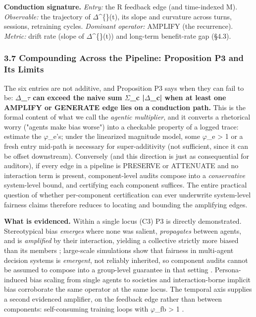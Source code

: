 \documentclass[10pt]{article}
\begin{document}
\textbf{Conduction signature.} \emph{Entry:} the R feedback edge (and time-indexed M). \emph{Observable:} the trajectory of $\Delta$\textasciicircum\{\}(t), its slope and curvature across turns, sessions, retraining cycles. \emph{Dominant operator:} AMPLIFY (the recurrence). \emph{Metric:} drift rate (slope of $\Delta$\textasciicircum\{\}(t)) and long-term benefit-rate gap \cite{xu2024adapting} (\S{}4.3).

\subsubsection*{3.7 Compounding Across the Pipeline: Proposition P3 and Its Limits}

The six entries are not additive, and Proposition P3 says when they can fail to be: \textbf{$\Delta$\_$\tau$ can exceed the naive sum $\Sigma$\_c |$\Delta$\_c| when at least one AMPLIFY or GENERATE edge lies on a conduction path.} This is the formal content of what we call the \emph{agentic multiplier}, and it converts a rhetorical worry ("agents make bias worse") into a checkable property of a logged trace: estimate the $\varphi$\_e's; under the linearized magnitude model, some $\varphi$\_e > 1 or a fresh entry mid-path is necessary for super-additivity (not sufficient, since it can be offset downstream). Conversely (and this direction is just as consequential for auditors), if every edge in a pipeline is PRESERVE or ATTENUATE and no interaction term is present, component-level audits compose into a \emph{conservative} system-level bound, and certifying each component suffices. The entire practical question of whether per-component certification can ever underwrite system-level fairness claims therefore reduces to locating and bounding the amplifying edges.

\textbf{What is evidenced.} Within a single locus (C3) P3 is directly demonstrated. Stereotypical bias \emph{emerges} where none was salient, \emph{propagates} between agents, and is \emph{amplified} by their interaction, yielding a collective strictly more biased than its members \cite{nguyen2025social}; large-scale simulations show that fairness in multi-agent decision systems is \emph{emergent}, not reliably inherited, so component audits cannot be assumed to compose into a group-level guarantee in that setting \cite{madigan2025emergent}. Persona-induced bias scaling from single agents to societies \cite{li2025from} and interaction-borne implicit bias \cite{borah2024implicit} corroborate the same operator at the same locus. The temporal axis supplies a second evidenced amplifier, on the feedback edge rather than between components: self-consuming training loops with $\varphi$\_fb > 1 \cite{wyllie2024fairness,wang2026observations,mansoury2020feedback}.
\end{document}
